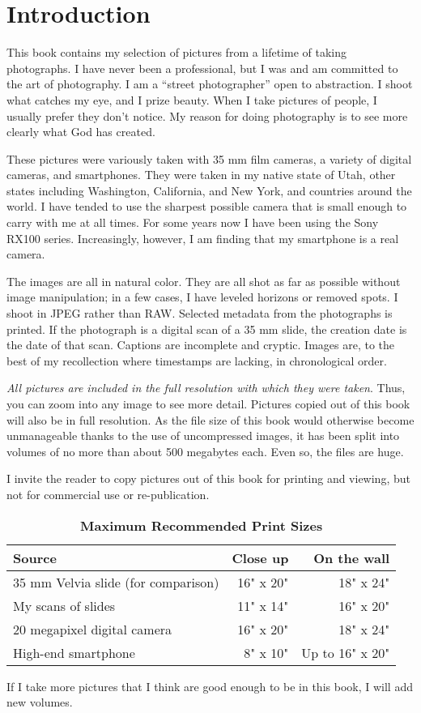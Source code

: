 \chapter{Introduction}

This book contains my selection of pictures from a lifetime of taking photographs. I have never been a professional, but I was and am committed to the art of photography. I am a ``street photographer'' open to abstraction. I shoot what catches my eye, and I prize beauty. When I take pictures of people, I usually prefer they don't notice. My reason for doing photography is to see more clearly what God has created.

These pictures were variously taken with 35 mm film cameras, a variety of digital cameras, and smartphones. They were taken in my native state of Utah, other states including Washington, California, and New York, and countries around the world. I have tended to use the sharpest possible camera that is small enough to carry with me at all times. For some years now I have been using the Sony RX100 series. Increasingly, however, I am finding that my smartphone is a real camera.

The images are all in natural color. They are all shot as far as possible without image manipulation; in a few cases, I have leveled horizons or removed spots. I shoot in JPEG rather than RAW. Selected metadata from the photographs is printed. If the photograph is a digital scan of a 35 mm slide, the creation date is the date of that scan. Captions are incomplete and cryptic. Images are, to the best of my recollection where timestamps are lacking, in chronological order.

\emph{All pictures are included in the full resolution with which they were taken}. Thus, you can zoom into any image to see more detail. Pictures copied out of this book will also be in full resolution. As the file size of this book would otherwise become unmanageable thanks to the use of uncompressed images, it has been split into volumes of no more than about 500 megabytes each. Even so, the files are huge.

I invite the reader to copy pictures out of this book for printing and viewing, but not for commercial use or re-publication. 

\begin{table}[h]
\centering
\captionsetup{labelformat=empty}
\caption{\textbf{Maximum Recommended Print Sizes}}
\begin{tabular}{lrr}
\hline
Source                       & Close up & On the wall  \\
\hline
35 mm Velvia slide (for comparison) & 16" x 20" & 18" x 24" \\
My scans of slides                            & 11" x 14"  & 16" x 20"  \\
20 megapixel digital camera             & 16" x 20"  & 18" x 24"  \\
High-end smartphone                      & 8" x 10"   & Up to 16" x 20"  \\
\hline
\end{tabular}
\end{table}

If I take more pictures that I think are good enough to be in this book, I will add new volumes.
